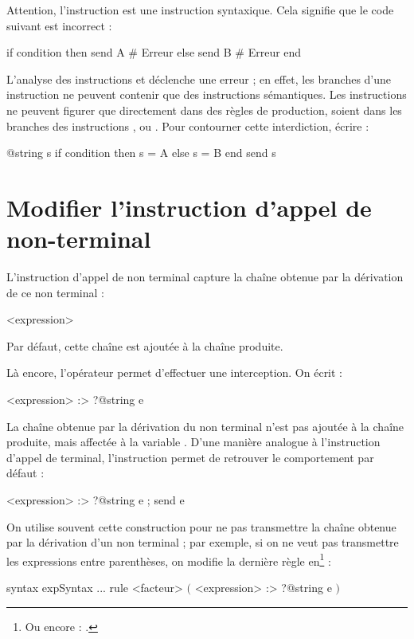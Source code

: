 Attention, l'instruction  est une instruction syntaxique. Cela signifie que le code suivant est incorrect :
\begin{galgascode}
if condition then
  send A # Erreur
else
  send B # Erreur
end
\end{galgascode}

L'analyse des instructions  et   déclenche une erreur ; en effet, les branches d'une instruction  ne peuvent contenir que des instructions sémantiques. Les instructions  ne peuvent figurer que directement dans des règles de production, soient dans les branches des instructions ,  ou . Pour contourner cette interdiction, écrire :
\begin{galgascode}
@string s
if condition then
  s = A
else
  s = B
end
send s
\end{galgascode}



\section{Modifier l'instruction d'appel de non-terminal}

L'instruction d'appel de non terminal capture la chaîne obtenue par la dérivation de ce non terminal :
\begin{galgascode}
<expression>
\end{galgascode}


Par défaut, cette chaîne est ajoutée à la chaîne produite.

Là encore, l'opérateur \galgas{\:>} permet d'effectuer une interception. On écrit :
\begin{galgascode}
<expression> :> ?@string e
\end{galgascode}

La chaîne obtenue par la dérivation du non terminal  n'est pas ajoutée à la chaîne produite, mais affectée à la variable . D'une manière analogue à l'instruction d'appel de terminal, l'instruction  permet de retrouver le comportement par défaut :
\begin{galgascode}
<expression> :> ?@string e ; send e
\end{galgascode}

On utilise souvent cette construction pour ne pas transmettre la chaîne obtenue par la dérivation d'un non terminal ; par exemple, si on ne veut pas transmettre les expressions entre parenthèses, on modifie la dernière règle  en\footnote{Ou encore : .} :
\begin{galgascode}
syntax expSyntax {
  ...
  rule <facteur> {
    $($
    <expression> :> ?@string e
    $)$
  }
}
\end{galgascode}


